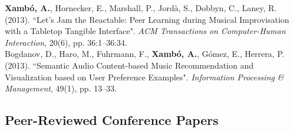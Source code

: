 \documentclass[10pt, a4paper]{article}
\newcommand{\years}[1]{\marginnote{\scriptsize #1}}
\begin{document}
{{\years{2013b}\textbf{Xambó, A.}, Hornecker, E., Marshall, P., Jordà, S., Dobbyn, C., Laney, R. (2013). “Let's Jam the Reactable: Peer Learning during Musical Improvisation with a Tabletop Tangible Interface". \emph{ACM Transactions on Computer-Human Interaction}, 20(6), pp. 36:1--36:34.\\
\years{2013a}Bogdanov, D., Haro, M., Fuhrmann, F., \textbf{Xambó, A.}, Gómez, E., Herrera, P. (2013). “Semantic Audio Content-based Music Recommendation and Visualization based on User Preference Examples". \emph{Information Processing \& Management}, 49(1), pp. 13--33.%

\subsection*{Peer-Reviewed Conference Papers}
\noindent

}}
\end{document}
